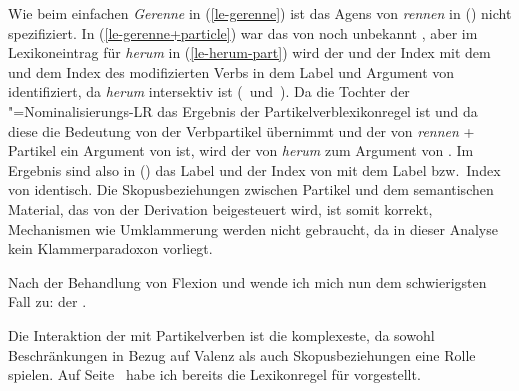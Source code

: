 \noindent
Wie beim einfachen \emph{Gerenne} in (\ref{le-gerenne}) ist das
Agens von \emph{rennen} in () nicht spezifiziert. 
In (\ref{le-gerenne+particle}) war das \argone von  noch unbekannt ,
aber im Lexikoneintrag für \emph{herum} in (\ref{le-herum-part}) wird der \ltopw und der Index mit dem \ltopw und dem Index
des modifizierten Verbs in dem Label und Argument von  identifiziert, da
\emph{herum} intersektiv ist (\, und \,). Da die Tochter der
\gee"=Nominalisierungs-LR das Ergebnis der Partikelverblexikonregel 
ist und da diese die Bedeutung von der Verbpartikel übernimmt und der \ltopw von \emph{rennen} + Partikel
ein Argument von  ist, wird der \ltopw von \emph{herum} zum Argument
von . Im Ergebnis sind also in
() das Label und der Index von  mit dem Label bzw.\ Index von  identisch.
Die Skopusbeziehungen zwischen Partikel und dem semantischen Material,
das von der Derivation beigesteuert wird, ist somit korrekt, Mechanismen
wie Umklammerung werden nicht gebraucht, da in dieser Analyse kein
Klammerparadoxon vorliegt.

\begin{comment}
The derivation with object predicatives and resultatives is completely analogous:
The rule in (\ref{lr-gee-nom}) is applied to the lexical entry for the object predicative
\emph{find}- (`find') producing \stem{gefinde}, which is then combined with 
\emph{schön} (`beautiful') to yield \emph{Schöngefinde}\iw{Schöngefinde} (`beautiful.finding').
In the case of resultative constructions, the listed entry for \emph{schlag}- (`to hit')
is fed into the lexical rule (\ref{lr-result}) for resultative constructions.
The output of this rule is the input to (\ref{lr-gee-nom}), yielding
\stem{geschlage}, which is then combined with \emph{tot} (`dead'),
resulting in \word{Totgeschlage} (`dead.beating').
\end{comment}
\fi
{}

Nach der Behandlung von Flexion und \geen wende ich mich nun
dem schwierigsten Fall zu: der \bard.

\label{sec-bard-pv}

Die\iw{\bars|(}%
Interaktion der \bard mit Partikelverben ist die
komplexeste, da sowohl Beschränkungen in Bezug auf Valenz
als auch Skopusbeziehungen eine Rolle spielen.
Auf Seite~\pageref{lr-bar-adj} habe ich bereits die
Lexikonregel  für \bard vorgestellt.

